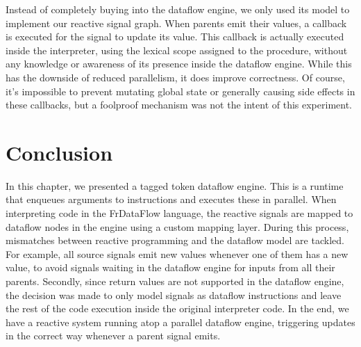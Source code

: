 Instead of completely buying into the dataflow engine, we only used its model to implement our reactive signal graph. When parents emit their values, a callback is executed for the signal to update its value. This callback is actually executed inside the interpreter, using the lexical scope assigned to the procedure, without any knowledge or awareness of its presence inside the dataflow engine.
While this has the downside of reduced parallelism, it does improve correctness. Of course, it's impossible to prevent mutating global state or generally causing side effects in these callbacks, but a foolproof mechanism was not the intent of this experiment. 

\section{Conclusion}

In this chapter, we presented a tagged token dataflow engine. This is a runtime that enqueues arguments to instructions and executes these in parallel. 
When interpreting code in the FrDataFlow language, the reactive signals are mapped to dataflow nodes in the engine using a custom mapping layer. During this process, mismatches between reactive programming and the dataflow model are tackled. For example, all source signals emit new values whenever one of them has a new value, to avoid signals waiting in the dataflow engine for inputs from all their parents. Secondly, since return values are not supported in the dataflow engine, the decision was made to only model signals as dataflow instructions and leave the rest of the code execution inside the original interpreter code. 
In the end, we have a reactive system running atop a parallel dataflow engine, triggering updates in the correct way whenever a parent signal emits. 





